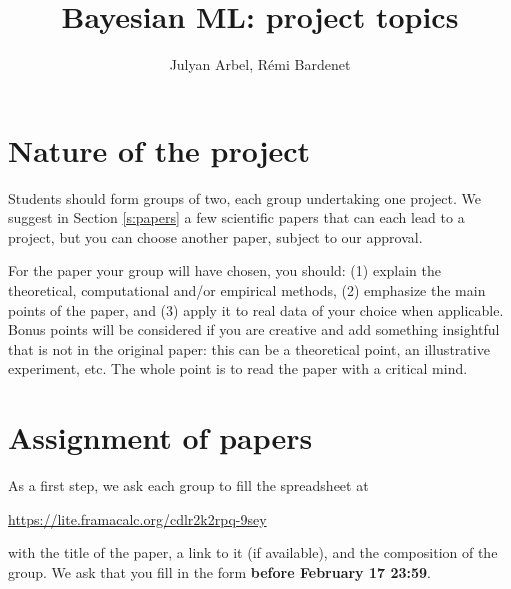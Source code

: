 \documentclass[12pt]{article}%
\date{}
\begin{document}
\title{Bayesian ML: project topics}
\author{Julyan Arbel, R\'emi Bardenet}
\maketitle

\section{Nature of the project}
Students should form groups of two, each group undertaking one project. We suggest in Section \ref{s:papers} a few scientific papers that can each lead to a project, but you can choose another paper, subject to our approval.

For the paper your group will have chosen, you should: (1) explain the theoretical, computational and/or empirical methods, (2) emphasize the main points of the paper, and (3) apply it to real data of your choice when applicable. Bonus points will be considered if you are creative and add something insightful that is not in the original paper: this can be a theoretical point, an illustrative experiment, etc. The whole point is to read the paper with a critical mind.

\section{Assignment of papers}
As a first step, we ask each group to fill the spreadsheet at
\begin{center}
   \href{https://lite.framacalc.org/cdlr2k2rpq-9sey}{https://lite.framacalc.org/cdlr2k2rpq-9sey}
 \end{center}
with the title of the paper, a link to it (if available), and the composition of the group.
We ask that you fill in the form {\bf before February 17 23:59}. 
\end{document}
